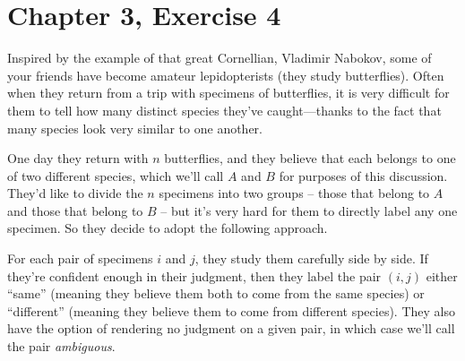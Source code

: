 \documentclass[12pt, letterpaper]{article}
\begin{document}





\clearpage
\section{Chapter 3, Exercise 4}
Inspired by the example of that great Cornellian, Vladimir Nabokov, some of your friends have become amateur lepidopterists (they study butterflies). 
Often when they return from a trip with specimens of butterflies, it is very difficult for them to tell how many distinct species they've caught—thanks to the fact that many species look very similar to one another.

One day they return with $n$ butterflies, and they believe that each belongs to one of two different species, which we'll call $A$ and $B$ for purposes of this discussion. 
They'd like to divide the $n$ specimens into two groups -- those that belong to $A$ and those that belong to $B$ -- but it's very hard for them to directly label any one specimen. 
So they decide to adopt the following approach.

For each pair of specimens $i$ and $j$, they study them carefully side by side. If they're confident enough in their judgment, then they label the pair $(i, j)$ either “same” (meaning they believe them both to come from the same species) or “different” (meaning they believe them to come from different species). They also have the option of rendering no judgment on a given pair, in which case we'll call the pair \textit{ambiguous}.
\end{document}
